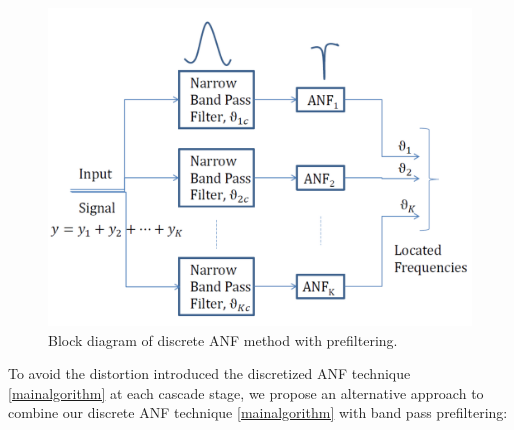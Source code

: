 \documentclass{UCF_ETD}
\begin{document}
\begin{figure}[H]
  \begin{center}
  \includegraphics[scale=0.6]{NonuniformANF/PrefilterParallel}
  \caption{Block diagram of discrete ANF method with  prefiltering.
  }
  \label{ANFblocks.fig} %
  \end{center}
  \end{figure}

To avoid the distortion introduced  the discretized ANF technique \eqref{mainalgorithm} at each cascade stage,
we propose an alternative approach to combine our discrete ANF technique \eqref{mainalgorithm} with  band pass prefiltering:
%
\end{document}
